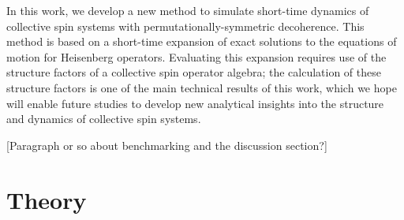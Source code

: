 \documentclass[pra,reprint,longbibliography]{revtex4-1}
\newcommand{\1}{\mathds{1}}
\begin{document}
In this work, we develop a new method to simulate short-time dynamics
of collective spin systems with permutationally-symmetric decoherence.
This method is based on a short-time expansion of exact solutions to
the equations of motion for Heisenberg operators.  Evaluating this
expansion requires use of the structure factors of a collective spin
operator algebra; the calculation of these structure factors is one of
the main technical results of this work, which we hope will enable
future studies to develop new analytical insights into the structure
and dynamics of collective spin systems.

[Paragraph or so about benchmarking and the discussion section?]


\section{Theory}
\end{document}

